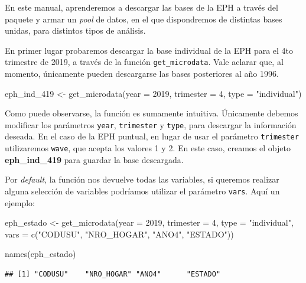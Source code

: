 \documentclass[
]{book}
\newenvironment{Shaded}{\begin{snugshade}}{\end{snugshade}}
\newcommand{\AttributeTok}[1]{\textcolor[rgb]{0.77,0.63,0.00}{#1}}
\newcommand{\DecValTok}[1]{\textcolor[rgb]{0.00,0.00,0.81}{#1}}
\newcommand{\FunctionTok}[1]{\textcolor[rgb]{0.00,0.00,0.00}{#1}}
\newcommand{\NormalTok}[1]{#1}
\newcommand{\OtherTok}[1]{\textcolor[rgb]{0.56,0.35,0.01}{#1}}
\newcommand{\StringTok}[1]{\textcolor[rgb]{0.31,0.60,0.02}{#1}}
\begin{document}
En este manual, aprenderemos a descargar las bases de la EPH a través del paquete y armar un \emph{pool} de datos, en el que dispondremos de distintas bases unidas, para distintos tipos de análisis.

En primer lugar probaremos descargar la base individual de la EPH para el 4to trimestre de 2019, a través de la función \texttt{get\_microdata}. Vale aclarar que, al momento, únicamente pueden descargarse las bases posteriores al año 1996.

\begin{Shaded}
\begin{Highlighting}[]
\NormalTok{eph\_ind\_419 }\OtherTok{\textless{}{-}} \FunctionTok{get\_microdata}\NormalTok{(}\AttributeTok{year =} \DecValTok{2019}\NormalTok{, }\AttributeTok{trimester =} \DecValTok{4}\NormalTok{, }\AttributeTok{type =} \StringTok{"individual"}\NormalTok{)}
\end{Highlighting}
\end{Shaded}

Como puede observarse, la función es sumamente intuitiva. Únicamente debemos modificar los parámetros \texttt{year}, \texttt{trimester} y \texttt{type}, para descargar la información deseada. En el caso de la EPH puntual, en lugar de usar el parámetro \texttt{trimester} utilizaremos \texttt{wave}, que acepta los valores 1 y 2. En este caso, creamos el objeto \textbf{eph\_ind\_419} para guardar la base descargada.

Por \emph{default}, la función nos devuelve todas las variables, si queremos realizar alguna selección de variables podríamos utilizar el parámetro \texttt{vars}. Aquí un ejemplo:

\begin{Shaded}
\begin{Highlighting}[]
\NormalTok{eph\_estado }\OtherTok{\textless{}{-}} \FunctionTok{get\_microdata}\NormalTok{(}\AttributeTok{year =} \DecValTok{2019}\NormalTok{, }\AttributeTok{trimester =} \DecValTok{4}\NormalTok{, }\AttributeTok{type =} \StringTok{"individual"}\NormalTok{, }\AttributeTok{vars =} \FunctionTok{c}\NormalTok{(}\StringTok{"CODUSU"}\NormalTok{, }\StringTok{"NRO\_HOGAR"}\NormalTok{, }\StringTok{"ANO4"}\NormalTok{, }\StringTok{"ESTADO"}\NormalTok{))}

\FunctionTok{names}\NormalTok{(eph\_estado)}
\end{Highlighting}
\end{Shaded}

\begin{verbatim}
## [1] "CODUSU"    "NRO_HOGAR" "ANO4"      "ESTADO"
\end{verbatim}
\end{document}
